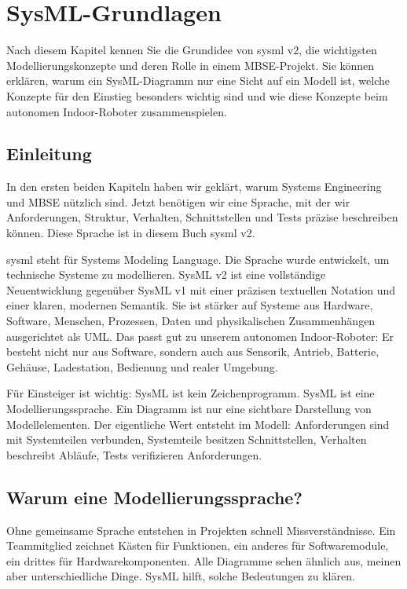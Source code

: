 \chapter{SysML-Grundlagen}

\begin{lernziele}
Nach diesem Kapitel kennen Sie die Grundidee von \gls{sysml} v2, die wichtigsten Modellierungskonzepte und deren Rolle in einem MBSE-Projekt. Sie können erklären, warum ein SysML-Diagramm nur eine Sicht auf ein Modell ist, welche Konzepte für den Einstieg besonders wichtig sind und wie diese Konzepte beim autonomen Indoor-Roboter zusammenspielen.
\end{lernziele}

\section{Einleitung}
In den ersten beiden Kapiteln haben wir geklärt, warum Systems Engineering und MBSE nützlich sind. Jetzt benötigen wir eine Sprache, mit der wir Anforderungen, Struktur, Verhalten, Schnittstellen und Tests präzise beschreiben können. Diese Sprache ist in diesem Buch \gls{sysml} v2.

\gls{sysml} steht für Systems Modeling Language. Die Sprache wurde entwickelt, um technische Systeme zu modellieren. SysML v2 ist eine vollständige Neuentwicklung gegenüber SysML v1 mit einer präzisen textuellen Notation und einer klaren, modernen Semantik. Sie ist stärker auf Systeme aus Hardware, Software, Menschen, Prozessen, Daten und physikalischen Zusammenhängen ausgerichtet als UML. Das passt gut zu unserem autonomen Indoor-Roboter: Er besteht nicht nur aus Software, sondern auch aus Sensorik, Antrieb, Batterie, Gehäuse, Ladestation, Bedienung und realer Umgebung.

Für Einsteiger ist wichtig: SysML ist kein Zeichenprogramm. SysML ist eine Modellierungssprache. Ein Diagramm ist nur eine sichtbare Darstellung von Modellelementen. Der eigentliche Wert entsteht im Modell: Anforderungen sind mit Systemteilen verbunden, Systemteile besitzen Schnittstellen, Verhalten beschreibt Abläufe, Tests verifizieren Anforderungen.

\section{Warum eine Modellierungssprache?}
Ohne gemeinsame Sprache entstehen in Projekten schnell Missverständnisse. Ein Teammitglied zeichnet Kästen für Funktionen, ein anderes für Softwaremodule, ein drittes für Hardwarekomponenten. Alle Diagramme sehen ähnlich aus, meinen aber unterschiedliche Dinge. SysML hilft, solche Bedeutungen zu klären.

